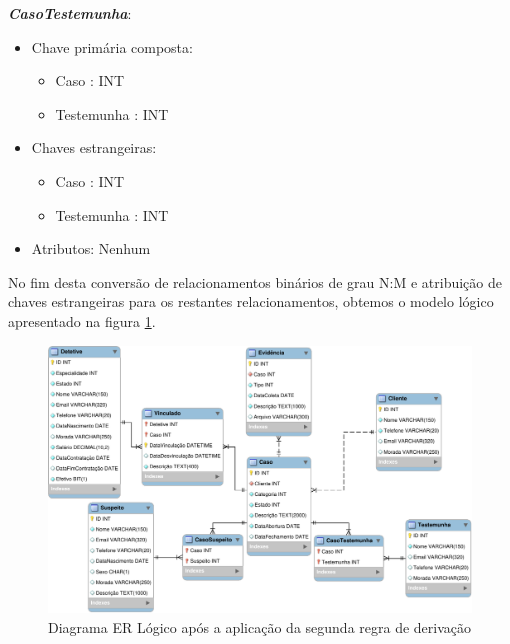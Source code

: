 \documentclass[a4paper,12pt]{scrreprt}
\begin{document}
        \clearpage           
        
        \textbf{\textit{CasoTestemunha}}:
        \begin{itemize}
            \item Chave primária composta:
                \begin{itemize}
                    \item Caso : INT
                    \item Testemunha : INT
                \end{itemize}
            \item Chaves estrangeiras:
                \begin{itemize}
                    \item Caso : INT
                    \item Testemunha : INT
                \end{itemize}
            \item Atributos: Nenhum
        \end{itemize}

        \vspace{0.2cm}

        No fim desta conversão de relacionamentos binários de grau N:M e atribuição de chaves estrangeiras para os restantes relacionamentos, obtemos o modelo lógico apresentado na figura \ref{fig:4.2}.


        \begin{figure}
            \centering
            \includegraphics[scale=1,angle=0]{images/modelo_logico/regra2.pdf}
            \caption{Diagrama ER Lógico após a aplicação da segunda regra de derivação}
            \label{fig:4.2}
        \end{figure}
\end{document}
